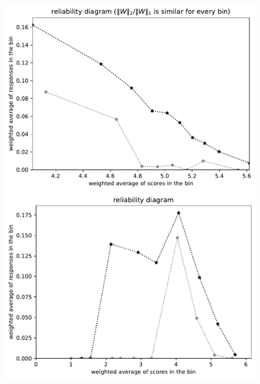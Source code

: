 \documentclass{article}
\newlength{\vertsep}
\newlength{\imsize}
\begin{document}
\begin{figure}
\begin{centering}
\parbox{\imsize}{\includegraphics[width=\imsize]
{../codes/weighted/County_of_Alameda_vs_Placer-LNGI/equierrs10.pdf}}
\quad\quad
\parbox{\imsize}{\includegraphics[width=\imsize]
{../codes/weighted/County_of_Alameda_vs_Placer-LNGI/equiscores10.pdf}}

\vspace{\vertsep}


\end{centering}
\end{figure}
\end{document}
